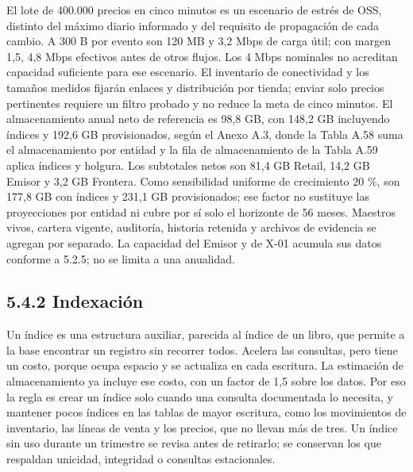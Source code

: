 \documentclass[11pt]{article}
\begin{document}
El lote de 400.000 precios en cinco minutos es un escenario de estrés de OSS, distinto del máximo diario informado y del requisito de propagación de cada cambio. A 300 B por evento son 120 MB y 3,2 Mbps de carga útil; con margen 1,5, 4,8 Mbps efectivos antes de otros flujos. Los 4 Mbps nominales no acreditan capacidad suficiente para ese escenario. El inventario de conectividad y los tamaños medidos fijarán enlaces y distribución por tienda; enviar solo precios pertinentes requiere un filtro probado y no reduce la meta de cinco minutos. El almacenamiento anual neto de referencia es 98,8 GB, con 148,2 GB incluyendo índices y 192,6 GB provisionados, según el Anexo A.3, donde la Tabla A.58 suma el almacenamiento por entidad y la fila de almacenamiento de la Tabla A.59 aplica índices y holgura. Los subtotales netos son 81,4 GB Retail, 14,2 GB Emisor y 3,2 GB Frontera. Como sensibilidad uniforme de crecimiento 20 \%, son 177,8 GB con índices y 231,1 GB provisionados; ese factor no sustituye las proyecciones por entidad ni cubre por sí solo el horizonte de 56 meses. Maestros vivos, cartera vigente, auditoría, historia retenida y archivos de evidencia se agregan por separado. La capacidad del Emisor y de X-01 acumula sus datos conforme a 5.2.5; no se limita a una anualidad.

\subsection{5.4.2 Indexación}

Un índice es una estructura auxiliar, parecida al índice de un libro, que permite a la base encontrar un registro sin recorrer todos. Acelera las consultas, pero tiene un costo, porque ocupa espacio y se actualiza en cada escritura. La estimación de almacenamiento ya incluye ese costo, con un factor de 1,5 sobre los datos. Por eso la regla es crear un índice solo cuando una consulta documentada lo necesita, y mantener pocos índices en las tablas de mayor escritura, como los movimientos de inventario, las líneas de venta y los precios, que no llevan más de tres. Un índice sin uso durante un trimestre se revisa antes de retirarlo; se conservan los que respaldan unicidad, integridad o consultas estacionales.
\end{document}
